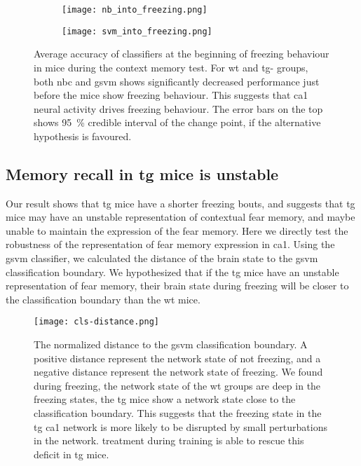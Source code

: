 \begin{figure}[h]
    \begin{subfigure}[h]{\textwidth}
        \texttt{[image: nb\_into\_freezing.png]}
        \caption{\label{f.ad.nb_into_f}}
    \end{subfigure}
    \begin{subfigure}[h]{\textwidth}
        \texttt{[image: svm\_into\_freezing.png]}
        \caption{\label{f.ad.svm_into_f}}
    \end{subfigure}
    \caption[Average accuracy of classifiers at initiation of freezing behaviour.]{Average accuracy of classifiers at the beginning of freezing behaviour in mice during the context memory test. For \gls{wt} and \gls{tg}-\glu{} groups, both \gls{nbc} and \gls{gsvm} shows significantly decreased performance just before the mice show freezing behaviour. This suggests that \gls{ca1} neural activity drives freezing behaviour. The error bars on the top shows \SI{95}{\percent} credible interval of the change point, if the alternative hypothesis is favoured. \label{f.ad.into_f}}
\end{figure}

\subsection{Memory recall in \gls{tg} mice is unstable}
Our result shows that \gls{tg} mice have a shorter freezing bouts, and suggests that \gls{tg} mice may have an unstable representation of contextual fear memory, and maybe unable to maintain the expression of the fear memory. Here we directly test the robustness of the representation of fear memory expression in \gls{ca1}. Using the \gls{gsvm} classifier, we calculated the distance of the brain state to the \gls{gsvm} classification boundary. We hypothesized that if the \gls{tg} mice have an unstable representation of fear memory, their brain state during freezing will be closer to the classification boundary than the \gls{wt} mice. 

\begin{figure}[h]
    \texttt{[image: cls-distance.png]}
    \caption[Normalized distance to the \gls{gsvm} classification boundary.]{The normalized distance to the \gls{gsvm} classification boundary. A positive distance represent the network state of not freezing, and a negative distance represent the network state of freezing. We found during freezing, the network state of the \gls{wt} groups are deep in the freezing states, the \gls{tg} mice show a network state close to the classification boundary. This suggests that the freezing state in the \gls{tg} \gls{ca1} network is more likely to be disrupted by small perturbations in the network. \tglu{} treatment during training is able to rescue this deficit in \gls{tg} mice. \label{f.ad.cls-distance}}
\end{figure}

